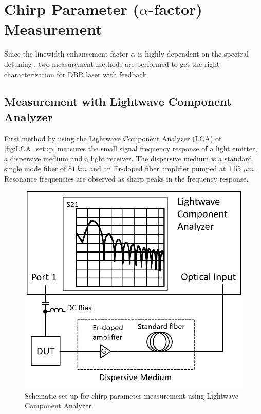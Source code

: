 


\section{Chirp Parameter ($\alpha$-factor) Measurement}\label{sec:chirp_measurement}
Since the linewidth enhancement factor $\alpha$ is highly dependent on the spectral detuning \cite{soriano2013complex}, two measurement methods are performed to get the right characterization for DBR laser with feedback.

\subsection{Measurement with Lightwave Component Analyzer}\label{subsec:measurement_with_LCA}
First method by using the Lightwave Component Analyzer (LCA) of \autoref{fig:LCA_setup} measures the small signal frequency response of a light emitter, a dispersive medium and a light receiver. The dispersive medium is a standard single mode fiber of $81 \ km$ and an Er-doped fiber amplifier pumped at 1.55 $\mu m$. Resonance frequencies are observed as sharp peaks in the frequency response.
\begin{figure}[ht]
    \centering
    \includegraphics[width=.6\linewidth]{figures/LCA_setup.png}
    \caption{Schematic set-up for chirp parameter measurement using Lightwave Component Analyzer.}
    \label{fig:LCA_setup}
\end{figure}

